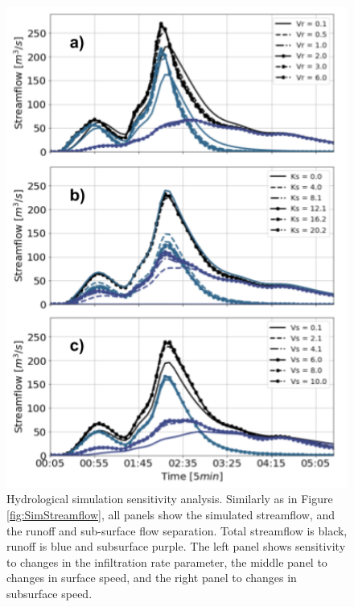 \documentclass[hess, manuscript]{copernicus}
\begin{document}
\begin{figure}[t]
\centering
 \includegraphics[width=14cm]{Figures/Parameter_variation_analysis.png}
 \caption{Hydrological simulation sensitivity analysis. Similarly as in Figure \ref{fig:SimStreamflow}, all panels show the simulated streamflow, and the runoff and sub-surface flow separation. Total streamflow is black, runoff is blue and subsurface purple. The left panel shows sensitivity to changes in the infiltration rate  parameter, the middle panel to changes in surface speed, and the right panel to changes in subsurface speed.}
    \label{fig:SimStreamflowSA}
\end{figure}
\end{document}
